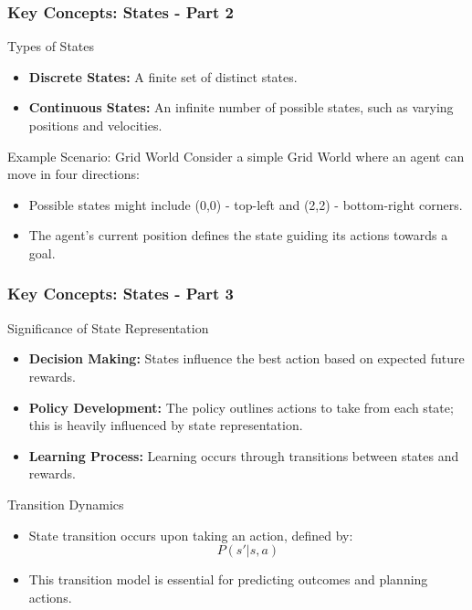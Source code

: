 \documentclass{beamer}
\begin{document}
\begin{frame}[fragile]
    \frametitle{Key Concepts: States - Part 2}
    \begin{block}{Types of States}
        \begin{itemize}
            \item \textbf{Discrete States:} A finite set of distinct states. 
            \item \textbf{Continuous States:} An infinite number of possible states, such as varying positions and velocities.
        \end{itemize}
    \end{block}

    \begin{block}{Example Scenario: Grid World}
        Consider a simple Grid World where an agent can move in four directions:
        \begin{itemize}
            \item Possible states might include (0,0) - top-left and (2,2) - bottom-right corners.
            \item The agent's current position defines the state guiding its actions towards a goal.
        \end{itemize}
    \end{block}
\end{frame}

\begin{frame}[fragile]
    \frametitle{Key Concepts: States - Part 3}
    \begin{block}{Significance of State Representation}
        \begin{itemize}
            \item \textbf{Decision Making:} States influence the best action based on expected future rewards.
            \item \textbf{Policy Development:} The policy outlines actions to take from each state; this is heavily influenced by state representation.
            \item \textbf{Learning Process:} Learning occurs through transitions between states and rewards.
        \end{itemize}
    \end{block}

    \begin{block}{Transition Dynamics}
        \begin{itemize}
            \item State transition occurs upon taking an action, defined by:
            \begin{equation}
                P(s' | s, a) 
            \end{equation}
            \item This transition model is essential for predicting outcomes and planning actions.
        \end{itemize}
    \end{block}
\end{frame}
\end{document}
